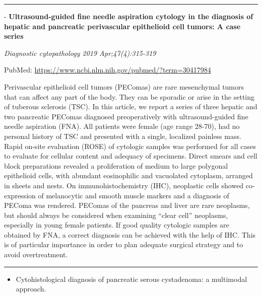 \documentclass[]{article}
\providecommand{\tightlist}{%
  \setlength{\itemsep}{0pt}\setlength{\parskip}{0pt}}
\begin{document}
{}

{}

\begin{center}\rule{0.5\linewidth}{\linethickness}\end{center}

 - \textbf{Ultrasound-guided fine needle aspiration cytology in the
diagnosis of hepatic and pancreatic perivascular epithelioid cell
tumors: A case series}

\emph{Diagnostic cytopathology 2019 Apr;47(4):315-319}

PubMed: \url{https://www.ncbi.nlm.nih.gov/pubmed/?term=30417984}

Perivascular epithelioid cell tumors (PEComas) are rare mesenchymal
tumors that can affect any part of the body. They can be sporadic or
arise in the setting of tuberous sclerosis (TSC). In this article, we
report a series of three hepatic and two pancreatic PEComas diagnosed
preoperatively with ultrasound-guided fine needle aspiration (FNA). All
patients were female (age range 28-70), had no personal history of TSC
and presented with a single, localized painless mass. Rapid on-site
evaluation (ROSE) of cytologic samples was performed for all cases to
evaluate for cellular content and adequacy of specimens. Direct smears
and cell block preparations revealed a proliferation of medium to large
polygonal epithelioid cells, with abundant eosinophilic and vacuolated
cytoplasm, arranged in sheets and nests. On immunohistochemistry (IHC),
neoplastic cells showed co-expression of melanocytic and smooth muscle
markers and a diagnosis of PEComa was rendered. PEComas of the pancreas
and liver are rare neoplasms, but should always be considered when
examining ``clear cell'' neoplasms, especially in young female patients.
If good quality cytologic samples are obtained by FNA, a correct
diagnosis can be achieved with the help of IHC. This is of particular
importance in order to plan adequate surgical strategy and to avoid
overtreatment.

{}

{}

\begin{center}\rule{0.5\linewidth}{\linethickness}\end{center}

\begin{itemize}
\tightlist
\item
  Cytohistological diagnosis of pancreatic serous cystadenoma: a
  multimodal approach.
\end{itemize}
\end{document}
